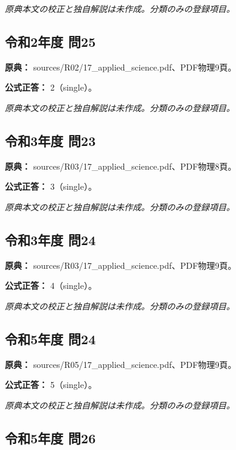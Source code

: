 \par\textit{原典本文の校正と独自解説は未作成。分類のみの登録項目。}

\subsection{令和2年度 問25}
\label{q:r02-reg-applied-25}

\noindent\textbf{原典：} sources/R02/17\_applied\_science.pdf、PDF物理9頁。

\textbf{公式正答：} 2（single）。

\par\textit{原典本文の校正と独自解説は未作成。分類のみの登録項目。}

\subsection{令和3年度 問23}
\label{q:r03-reg-applied-23}

\noindent\textbf{原典：} sources/R03/17\_applied\_science.pdf、PDF物理8頁。

\textbf{公式正答：} 3（single）。

\par\textit{原典本文の校正と独自解説は未作成。分類のみの登録項目。}

\subsection{令和3年度 問24}
\label{q:r03-reg-applied-24}

\noindent\textbf{原典：} sources/R03/17\_applied\_science.pdf、PDF物理9頁。

\textbf{公式正答：} 4（single）。

\par\textit{原典本文の校正と独自解説は未作成。分類のみの登録項目。}

\subsection{令和5年度 問24}
\label{q:r05-reg-applied-24}

\noindent\textbf{原典：} sources/R05/17\_applied\_science.pdf、PDF物理9頁。

\textbf{公式正答：} 5（single）。

\par\textit{原典本文の校正と独自解説は未作成。分類のみの登録項目。}

\subsection{令和5年度 問26}
\label{q:r05-reg-applied-26}


